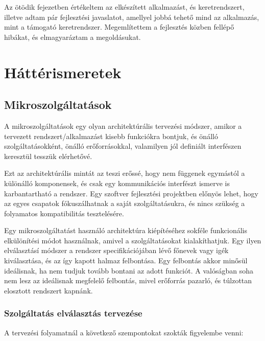\documentclass[11pt,magyar,a4paper,twoside,]{report}
\begin{document}
Az ötödik fejezetben értékeltem az elkészített alkalmazást, és
keretrendszert, illetve adtam pár fejlesztési javaslatot, amellyel jobbá
tehető mind az alkalmazás, mint a támogató keretrendszer. Megemlítettem
a fejlesztés közben fellépő hibákat, és elmagyaráztam a megoldásukat.

\chapter{Háttérismeretek}\label{huxe1ttuxe9rismeretek}

\section{Mikroszolgáltatások}\label{mikroszolguxe1ltatuxe1sok}

A mikroszolgáltatások\citep{microservices} \citep{micro-arch}
\citep{microservices-light} egy olyan architektúrális tervezési módszer,
amikor a tervezett rendszert/alkalmazást kisebb funkciókra bontjuk, és
önálló szolgáltatásokként, önálló erőforrásokkal, valamilyen jól
definiált interfészen keresztül tesszük elérhetővé.

Ezt az architektúrális mintát az teszi erőssé, hogy nem függenek
egymástól a különálló komponensek, és csak egy kommunikációs interfészt
ismerve is karbantartható a rendszer. Egy szoftver fejlesztési
projektben előnyös lehet, hogy az egyes csapatok fókuszálhatnak a saját
szolgáltatásukra, és nincs szükség a folyamatos kompatibilitás
tesztelésére.

Egy mikroszolgáltatást használó architektúra kiépítéséhez sokféle
funkcionális elkülönítési módot használnak, amivel a szolgáltatásokat
kialakíthatjuk. Egy ilyen elválasztásí módszer a rendszer
specifikációjában lévő főnevek vagy igék kiválasztása, és az így kapott
halmaz felbontása. Egy felbontás akkor minősül ideálisnak, ha nem tudjuk
tovább bontani az adott funkciót. A valóságban soha nem lesz az
ideálisnak megfelelő felbontás, mivel erőforrás pazarló, és túlzottan
elosztott rendszert kapnánk.

\subsection{\texorpdfstring{Szolgáltatás elválasztás
tervezése\label{splitting}}{Szolgáltatás elválasztás tervezése}}\label{szolguxe1ltatuxe1s-elvuxe1lasztuxe1s-tervezuxe9se}

A tervezési folyamatnál a következő szempontokat szokták figyelembe
venni:
\end{document}
